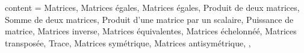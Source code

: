 {
  content = {
    Matrices,
    Matrices égales,
    Matrices égales,
    Produit de deux matrices,
    Somme de deux matrices,
    Produit d'une matrice par un scalaire,
    Puissance de matrice,
    Matrices inverse,
    Matrices équivalentes,
    Matrices échelonnéé,
    Matrices transposée,
    Trace,
    Matrices symétrique,
    Matrices antisymétrique,
  },
}
\endinput
bla blab \bla